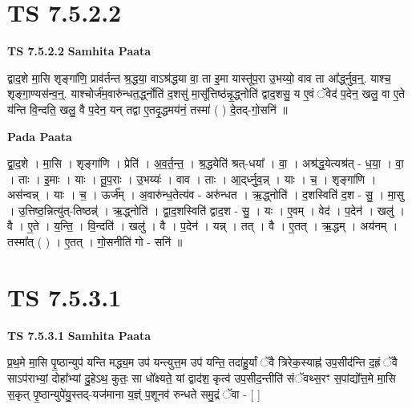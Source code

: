 \documentclass[17pt]{extarticle}
\begin{document}
\section*{ TS 7.5.2.2 }

\textbf{TS 7.5.2.2 } \newline
\textbf{Samhita Paata} \newline

द्वाद॒शे मा॒सि शृङ्गा॑णि॒ प्राव॑र्तन्त श्र॒द्धया॒ वाऽश्र॑द्धया वा॒ ता इ॒मा यास्तू॑प॒रा उ॒भय्यो॒ वाव ता आ᳚र्द्ध्नुव॒न्॒. याश्च॒ शृङ्गा॒ण्यस॑न्व॒न्॒. याश्चोर्ज॑म॒वारु॑न्धत॒र्द्ध्नोति॑ द॒शसु॑ मा॒सू᳚त्तिष्ठ॑न्नृ॒द्ध्नोति॑ द्वाद॒शसु॒ य ए॒वं ॅवेद॑ प॒देन॒ खलु॒ वा ए॒ते य॑न्ति वि॒न्दति॒ खलु॒ वै प॒देन॒ यन् तद्वा ए॒तदृ॒द्धमय॑नं॒ तस्मा॑ ( ) दे॒तद्-गो॒सनि॑ ॥ \newline

\textbf{Pada Paata} \newline

द्वा॒द॒शे । मा॒सि । शृङ्गा॑णि । प्रेति॑ । अ॒व॒र्त॒न्त॒ । श्र॒द्धयेति॑ श्रत्-धया᳚ । वा॒ । अश्र॑द्ध॒येत्यश्र॑त् - ध॒या॒ । वा॒ । ताः । इ॒माः । याः । तू॒प॒राः । उ॒भय्यः॑ । वाव । ताः । आ॒द्‌र्ध्नु॒व॒न्न् । याः । च॒ । शृङ्गा॑णि । अस॑न्वन्न् । याः । च॒ । ऊर्ज᳚म् । अ॒वारु॑न्ध॒तेत्य॑व - अरु॑न्धत । ऋ॒द्ध्नोति॑ । द॒शस्विति॑ द॒श - सु॒ । मा॒सु । उ॒त्तिष्ठ॒न्नित्यु॑त्-तिष्ठन्न्॑ । ऋ॒द्ध्नोति॑ । द्वा॒द॒शस्विति॑ द्वाद॒श - सु॒ । यः । ए॒वम् । वेद॑ । प॒देन॑ । खलु॑ । वै । ए॒ते । य॒न्ति॒ । वि॒न्दति॑ । खलु॑ । वै । प॒देन॑ । यन्न् । तत् । वै । ए॒तत् । ऋ॒द्धम् । अय॑नम् । तस्मा᳚त् ( ) । ए॒तत् । गो॒सनीति॑ गो - सनि॑ ॥  \newline




\section*{ TS 7.5.3.1 }

\textbf{TS 7.5.3.1 } \newline
\textbf{Samhita Paata} \newline

प्र॒थ॒मे मा॒सि पृ॒ष्ठान्युप॑ यन्ति मद्ध्य॒म उप॑ यन्त्युत्त॒म उप॑ यन्ति॒ तदा॑हु॒र्यां ॅवै त्रिरेक॒स्याह्न॑ उप॒सीद॑न्ति द॒ह्रं ॅवै साऽप॑राभ्यां॒ दोहा᳚भ्यां दु॒हेऽथ॒ कुतः॒ सा धो᳚क्ष्यते॒ यां द्वाद॑श॒ कृत्व॑ उप॒सीद॒न्तीति॑ संॅवथ्स॒रꣳ स॒पांद्यो᳚त्त॒मे मा॒सि स॒कृत् पृ॒ष्ठान्युपे॑यु॒स्तद्-यज॑माना य॒ज्ञ्ं प॒शूनव॑ रुन्धते समु॒द्रं ॅवा - [  ] \newline
\end{document}
